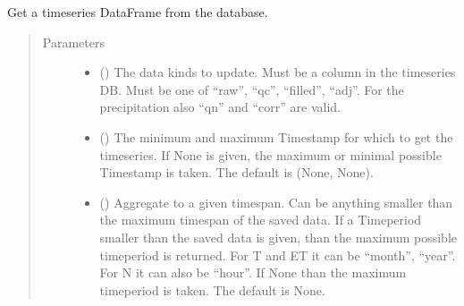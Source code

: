 \documentclass[letterpaper,10pt,english]{sphinxmanual}
\begin{document}
\begin{fulllineitems}
\begin{fulllineitems}
\label{\detokenize{weatherDB:weatherDB.station.StationBase.get_df}}
\sphinxAtStartPar
Get a timeseries DataFrame from the database.
\begin{quote}\begin{description}
\item[{Parameters}] \leavevmode\begin{itemize}
\item {} 
\sphinxAtStartPar
{} () \textendash{} The data kinds to update.
Must be a column in the timeseries DB.
Must be one of “raw”, “qc”, “filled”, “adj”.
For the precipitation also “qn” and “corr” are valid.

\item {} 
\sphinxAtStartPar
{} ({\hyperref[\detokenize{weatherDB.lib:weatherDB.lib.utils.TimestampPeriod}]{}}\sphinxstyleliteralemphasis{\sphinxupquote{(}}\sphinxstyleliteralemphasis{\sphinxupquote{)}}\sphinxstyleliteralemphasis{\sphinxupquote{, }}) \textendash{} The minimum and maximum Timestamp for which to get the timeseries.
If None is given, the maximum or minimal possible Timestamp is taken.
The default is (None, None).

\item {} 
\sphinxAtStartPar
{} (\sphinxstyleliteralemphasis{\sphinxupquote{, }}) \textendash{} Aggregate to a given timespan.
Can be anything smaller than the maximum timespan of the saved data.
If a Timeperiod smaller than the saved data is given, than the maximum possible timeperiod is returned.
For T and ET it can be “month”, “year”.
For N it can also be “hour”.
If None than the maximum timeperiod is taken.
The default is None.


\end{itemize}
\end{description}
\end{quote}
\end{fulllineitems}
\end{fulllineitems}
\end{document}
